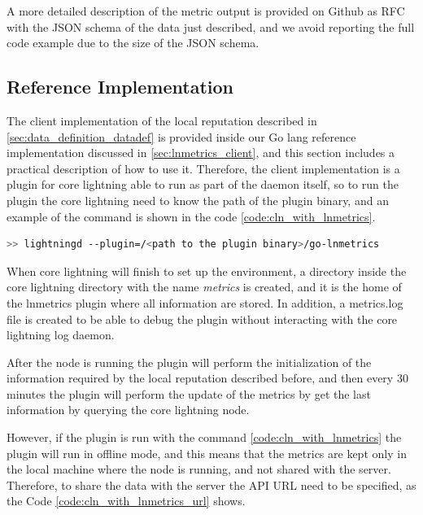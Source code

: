A more detailed description of the metric output is provided on Github as RFC with the JSON schema 
of the data just described, and we avoid reporting the full code example due to the size of the 
JSON schema. 

\subsection{Reference Implementation}

The client implementation of the local reputation described in \ref{sec:data_definition_datadef} 
is provided inside our Go lang reference implementation discussed in \ref{sec:lnmetrics_client},
and this section includes a practical description of how to use it.
Therefore, the client implementation is a plugin for core lightning able to 
run as part of the daemon itself, so to run the plugin the core lightning
need to know the path of the plugin binary, and an example of the command is shown in
the code \ref{code:cln_with_lnmetrics}.

\begin{lstlisting}[language=bash, basicstyle=\small,
                  caption={Command to run the core lightning daemon with the lnmetrics plugin enabled.}, 
                  label={code:cln_with_lnmetrics}]
>> lightningd --plugin=/<path to the plugin binary>/go-lnmetrics
\end{lstlisting}

When core lightning will finish to set up the environment, a directory inside 
the core lightning directory with the name \emph{metrics} is created, and 
it is the home of the lnmetrics plugin where all information are stored. 
In addition, a metrics.log file is created to be able to debug the 
plugin without interacting with the core lightning log daemon.

After the node is running the plugin will perform the initialization 
of the information required by the local reputation described before, and 
then every 30 minutes the plugin will perform the update of the metrics by 
get the last information by querying the core lightning node. 

However, if the plugin is run with the command \ref{code:cln_with_lnmetrics}
the plugin will run in offline mode, and this means that the metrics are kept 
only in the local machine where the node is running, and not shared with the server. 
Therefore, to share the data with the server the API URL need to be specified,
as the Code \ref{code:cln_with_lnmetrics_url} shows.

